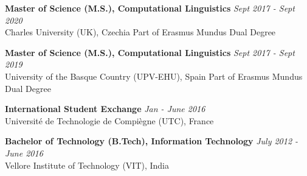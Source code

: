 
{\textbf{Master of Science (M.S.), Computational Linguistics}} \hfill 
    {\textit{Sept 2017 - Sept 2020}}\\
    Charles University (UK), Czechia \hfill Part of Erasmus Mundus Dual Degree

{\textbf{Master of Science (M.S.), Computational Linguistics}} \hfill 
    {\textit{Sept 2017 - Sept 2019}}\\
    University of the Basque Country (UPV-EHU), Spain \hfill Part of Erasmus Mundus Dual Degree

{\textbf{International Student Exchange}} \hfill {\textit{Jan - June 2016}}\\
    Universit\'e de Technologie de Compi\`egne (UTC), France
            
{\textbf{Bachelor of Technology (B.Tech), Information Technology}} \hfill
    {\textit{July 2012 - June 2016}}\\
        Vellore Institute of Technology (VIT), India